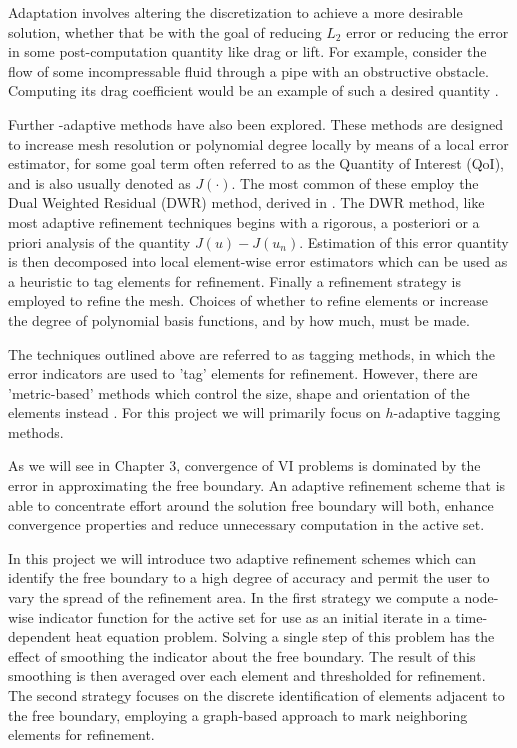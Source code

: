 \documentclass[]{interact}
\theoremstyle{plain}%
\theoremstyle{definition}
\theoremstyle{remark}
\begin{document}
Adaptation involves altering the discretization to achieve a more desirable solution, whether that be with the goal of reducing $L_2$ error or reducing the error in some post-computation quantity like drag or lift. For example, consider the flow of some incompressable fluid through a pipe with an obstructive obstacle. Computing its drag coefficient would be an example of such a desired quantity \citep[Chapter 1.1]{bangerth_adaptive_2003}.

Further -adaptive methods have also been explored. These methods are designed to increase mesh resolution or polynomial degree locally by means of a local error estimator, for some goal term often referred to as the Quantity of Interest (QoI), and is also usually denoted as $J(\cdot)$. The most common of these employ the Dual Weighted Residual (DWR) method, derived in \citet{becker_feed-back_1996}. The DWR method, like most adaptive refinement techniques begins with a rigorous, a posteriori or a priori analysis of the quantity $J(u) - J(u_n)$. Estimation of this error quantity is then decomposed into local element-wise error estimators which can be used as a heuristic to tag elements for refinement. Finally a refinement strategy is employed to refine the mesh. Choices of whether to refine elements or increase the degree of polynomial basis functions, and by how much, must be made. 

The techniques outlined above are referred to as tagging methods, in which the error indicators are used to 'tag' elements for refinement. However, there are 'metric-based' methods which control the size, shape and orientation of the elements instead \citep{alauzet_metric-based_2010}.  For this project we will primarily focus on $h$-adaptive tagging methods.

As we will see in Chapter 3, convergence of VI problems is dominated by the error in approximating the free boundary. An adaptive refinement scheme that is able to concentrate effort around the solution free boundary will both, enhance convergence properties and reduce unnecessary computation in the active set.


In this project we will introduce two adaptive refinement schemes which can identify the free boundary to a high degree of accuracy and permit the user to vary the spread of the refinement area. In the first strategy we compute a node-wise indicator function for the active set for use as an initial iterate in a time-dependent heat equation problem. Solving a single step of this problem has the effect of smoothing the indicator about the free boundary. The result of this smoothing is then averaged over each element and thresholded for refinement. The second strategy focuses on the discrete identification of elements adjacent to the free boundary, employing a graph-based approach to mark neighboring elements for refinement.
\end{document}

